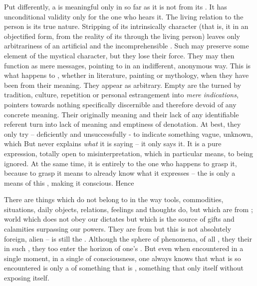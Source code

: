 Put differently, a  is meaningful only in so far as it is not
 from its .  It has unconditional validity only for
the one who hears it.  The living relation to the  person is its true
nature.  Stripping  of its intrinsically 
character (that is,  it in an {objectified} form,
 from the reality of its  through the living
person) leaves only arbitrariness of an artificial  and the
incomprehensible . Such  may preserve some element of
the mystical character, but they lose their  force.  They may
then function as mere messages,  pointing to  in an
indifferent, anonymous way.  This is what happens to , whether in
literature, painting or mythology, when they have been  from
their  meaning.  They appear as arbitrary.  Empty  are
the  turned by tradition, culture, repetition or personal
estrangement into {\em mere indications}, pointers towards nothing specifically
discernible and therefore devoid of any concrete meaning.  Their originally
 meaning and their lack of any identifiable referent turn into lack of
meaning and emptiness of denotation.  At best, they only try -- deficiently and
unsuccessfully - to indicate something vague, unknown, which  But  never explains {\em what} it is
saying -- it only says it.  It is a pure expression, totally open to
misinterpretation, which in particular means, to being ignored. At the same
time, it is entirely  to the one who happens to grasp it, because to
grasp it means to already know what it expresses -- the  is only a
means of  this , making it conscious.  Hence


 There are things which do not belong to 
in the way tools, commodities, situations, daily objects, relations, feelings
and thoughts do, but which are from ; world which does not
obey our dictates but which is the source of gifts and calamities surpassing our
powers.  They are from  but this  is not
absolutely foreign, alien --  is still the .
Although  the sphere of phenomena, of all , they  their  in such ,
they too enter the horizon of one's .  But even when encountered
in a single moment, in a single  of  consciousness, one
always knows that what is so encountered is only a  of something that
is , something that only  itself without exposing
itself.

